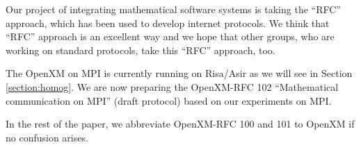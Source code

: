 Our project of integrating mathematical software
systems is taking the ``RFC'' approach, which has been
used to develop internet protocols.
We think that ``RFC'' approach is an excellent way and
we hope that other groups, who are working on standard protocols,
take this ``RFC'' approach, too.

The OpenXM on MPI \cite{MPI} is currently running on Risa/Asir
as we will see in Section \ref{section:homog}.
We are now preparing the OpenXM-RFC 102 ``Mathematical communication
on MPI'' (draft protocol)
based on our experiments on MPI.

In the rest of the paper, we abbreviate
OpenXM-RFC 100 and 101 to OpenXM if no confusion arises.









